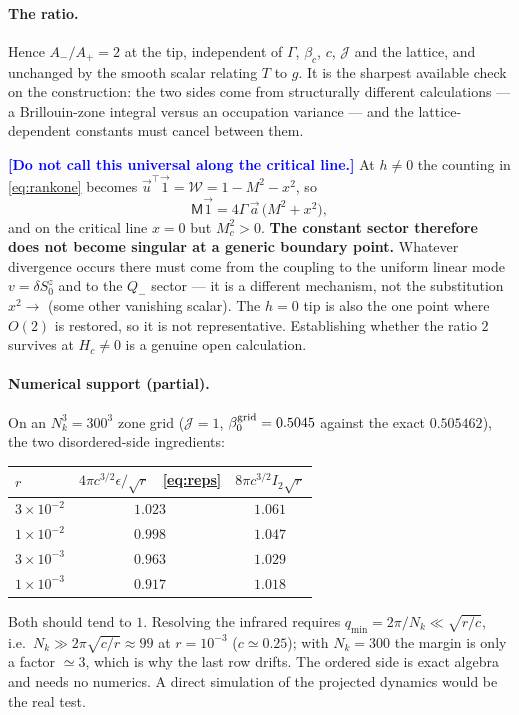 \documentclass[11pt,a4paper]{article}
\newcommand{\Jc}{\mathcal{J}}
\newcommand{\Wc}{\mathcal{W}}
\newcommand{\FLAG}[1]{\textcolor{blue}{\textbf{[#1]}}}
\newcommand{\Jc}{\mathcal{J}}
\newcommand{\Mc}{\mathsf{M}}
\newcommand{\Tm}{T}
\newcommand{\Wc}{\mathcal{W}}
\newcommand{\FLAG}[1]{\textcolor{blue}{\textbf{[#1]}}}
\begin{document}
\paragraph{The ratio.} Hence $A_-/A_+=2$ at the tip, independent of $\Gamma$, $\beta_c$,
$c$, $\Jc$ and the lattice, and unchanged by the smooth scalar relating $\Tm$ to $g$. It is
the sharpest available check on the construction: the two sides come from structurally
different calculations --- a Brillouin-zone integral versus an occupation variance --- and
the lattice-dependent constants must cancel between them.

\FLAG{Do not call this universal along the critical line.} At $h\neq0$ the counting in
\eqref{eq:rankone} becomes $\vec u^\top\vec1=\Wc=1-M^2-x^2$, so
\begin{equation}
  \Mc\vec1=4\Gamma\,\vec a\,\big(M^{2}+x^{2}\big),
\end{equation}
and on the critical line $x=0$ but $M_c^2>0$. \textbf{The constant sector therefore does not
become singular at a generic boundary point.} Whatever divergence occurs there must come
from the coupling to the uniform linear mode $v=\delta S^z_0$ and to the $Q_-$ sector --- it
is a different mechanism, not the substitution $x^2\to$ (some other vanishing scalar). The
$h=0$ tip is also the one point where $O(2)$ is restored, so it is not representative.
Establishing whether the ratio $2$ survives at $H_c\neq0$ is a genuine open calculation.

\paragraph{Numerical support (partial).} On an $N_k^3=300^3$ zone grid ($\Jc=1$,
$\beta_0^{\rm grid}=0.5045$ against the exact $0.505462$), the two disordered-side
ingredients:
\begin{center}
\begin{tabular}{lcc}
\hline
$r$ & $4\pi c^{3/2}\epsilon\big/\sqrt r$ \ \eqref{eq:reps} & $8\pi c^{3/2}I_2\sqrt r$ \\
\hline
$3\times10^{-2}$ & $1.023$ & $1.061$ \\
$1\times10^{-2}$ & $0.998$ & $1.047$ \\
$3\times10^{-3}$ & $0.963$ & $1.029$ \\
$1\times10^{-3}$ & $0.917$ & $1.018$ \\
\hline
\end{tabular}
\end{center}
Both should tend to $1$. Resolving the infrared requires
$q_{\min}=2\pi/N_k\ll\sqrt{r/c}$, i.e.\ $N_k\gg2\pi\sqrt{c/r}\approx99$ at $r=10^{-3}$
($c\simeq0.25$); with $N_k=300$ the margin is only a factor $\simeq3$, which is why the last
row drifts. The ordered side is exact algebra and needs no numerics. A direct simulation of
the projected dynamics would be the real test.
\end{document}

